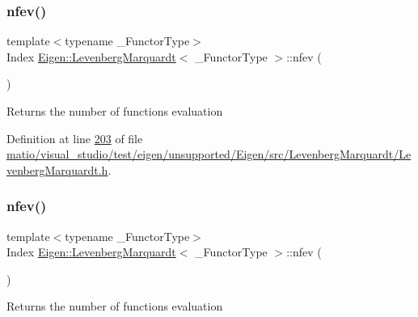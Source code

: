 \subsubsection{\texorpdfstring{nfev()}{nfev()}\hspace{0.1cm}{\footnotesize\ttfamily [1/2]}}
{\footnotesize\ttfamily template$<$typename \+\_\+\+Functor\+Type$>$ \\
Index \hyperlink{class_eigen_1_1_levenberg_marquardt}{Eigen\+::\+Levenberg\+Marquardt}$<$ \+\_\+\+Functor\+Type $>$\+::nfev (\begin{DoxyParamCaption}{ }\end{DoxyParamCaption})\hspace{0.3cm}{\ttfamily [inline]}}

\begin{DoxyReturn}{Returns}
the number of functions evaluation 
\end{DoxyReturn}


Definition at line \hyperlink{matio_2visual__studio_2test_2eigen_2unsupported_2_eigen_2src_2_levenberg_marquardt_2_levenberg_marquardt_8h_source_l00203}{203} of file \hyperlink{matio_2visual__studio_2test_2eigen_2unsupported_2_eigen_2src_2_levenberg_marquardt_2_levenberg_marquardt_8h_source}{matio/visual\+\_\+studio/test/eigen/unsupported/\+Eigen/src/\+Levenberg\+Marquardt/\+Levenberg\+Marquardt.\+h}.

\mbox{\label{class_eigen_1_1_levenberg_marquardt_ad9563c6abeb33c0aba82e55fd72c64a6}} 
\subsubsection{\texorpdfstring{nfev()}{nfev()}\hspace{0.1cm}{\footnotesize\ttfamily [2/2]}}
{\footnotesize\ttfamily template$<$typename \+\_\+\+Functor\+Type$>$ \\
Index \hyperlink{class_eigen_1_1_levenberg_marquardt}{Eigen\+::\+Levenberg\+Marquardt}$<$ \+\_\+\+Functor\+Type $>$\+::nfev (\begin{DoxyParamCaption}{ }\end{DoxyParamCaption})\hspace{0.3cm}{\ttfamily [inline]}}

\begin{DoxyReturn}{Returns}
the number of functions evaluation 
\end{DoxyReturn}


